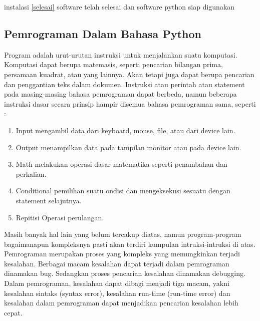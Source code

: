 \begin {enumerate}
	instalasi \ref {selesai} software telah selesai dan software python siap digunakan
	
	\end {enumerate}

\subsection {Pemrograman Dalam Bahasa Python}
	Program adalah urut-urutan instruksi untuk menjalankan suatu komputasi. Komputasi dapat berupa matemasis, seperti
	pencarian bilangan prima, persamaan kuadrat, atau yang lainnya. Akan tetapi juga dapat berupa
	pencarian dan penggantian teks dalam dokumen. Instruksi atau perintah atau statement
	pada masing-masing bahasa pemrograman dapat berbeda, namun beberapa instruksi dasar
	secara prinsip hampir disemua bahasa pemrograman sama, seperti :
	
	\begin {enumerate}
	
	\item
	Input
	mengambil data dari keyboard, mouse, file, atau dari device lain.
	\item
	Output
	menampilkan data pada tampilan monitor atau pada device lain.
	\item
	Math
	melakukan operasi dasar matematika seperti penambahan dan perkalian.
	\item
	Conditional
	pemilihan suatu ondisi dan mengeksekusi sesuatu dengan statement selajutnya.
	\item
	Repitisi
	Operasi perulangan.
	
	\end {enumerate}
    
  	Masih banyak hal lain yang belum tercakup diatas, namun program-program bagaimanapun kompleksnya pasti akan terdiri
   	kumpulan intruksi-intruksi di atas.
	Pemrograman merupakan proses yang kompleks yang memungkinkan terjadi kesalahan.
	Berbagai macam kesalahan dapat terjadi dalam pemrograman dinamakan bug. Sedangkan proses pencarian kesalahan dinamakan
	debugging. Dalam pemrograman, kesalahan dapat dibagi menjadi tiga macam, yakni kesalahan sintaks (syntax error), kesalahan run-time (run-time error)
	dan kesalahan dalam pemrograman dapat menjadikan pencarian kesalahan lebih cepat.
	
